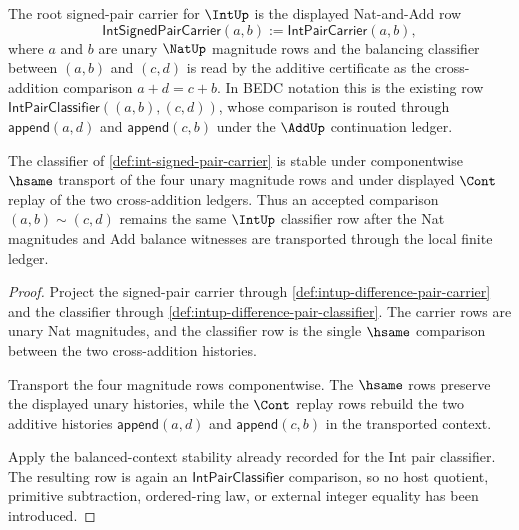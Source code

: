 \begin{definition}
\label{def:int-signed-pair-carrier}
The root signed-pair carrier for $\IntUp$ is the displayed Nat-and-Add row
$$
\mathsf{IntSignedPairCarrier}(a,b)
:=
\mathsf{IntPairCarrier}(a,b),
$$
where $a$ and $b$ are unary $\NatUp$ magnitude rows and the balancing classifier between $(a,b)$ and $(c,d)$ is read by the additive certificate as the cross-addition comparison $a+d=c+b$. In BEDC notation this is the existing row $\mathsf{IntPairClassifier}((a,b),(c,d))$, whose comparison is routed through $\mathsf{append}(a,d)$ and $\mathsf{append}(c,b)$ under the $\AddUp$ continuation ledger.
\end{definition}

\begin{theorem}
\label{thm:int-signed-pair-classifier-stability}
The classifier of \autoref{def:int-signed-pair-carrier} is stable under componentwise $\hsame$ transport of the four unary magnitude rows and under displayed $\Cont$ replay of the two cross-addition ledgers. Thus an accepted comparison $(a,b)\sim(c,d)$ remains the same $\IntUp$ classifier row after the Nat magnitudes and Add balance witnesses are transported through the local finite ledger.
\end{theorem}
\begin{proof}
Project the signed-pair carrier through \autoref{def:intup-difference-pair-carrier} and the classifier through \autoref{def:intup-difference-pair-classifier}. The carrier rows are unary Nat magnitudes, and the classifier row is the single $\hsame$ comparison between the two cross-addition histories.

Transport the four magnitude rows componentwise. The $\hsame$ rows preserve the displayed unary histories, while the $\Cont$ replay rows rebuild the two additive histories $\mathsf{append}(a,d)$ and $\mathsf{append}(c,b)$ in the transported context.

Apply the balanced-context stability already recorded for the Int pair classifier. The resulting row is again an $\mathsf{IntPairClassifier}$ comparison, so no host quotient, primitive subtraction, ordered-ring law, or external integer equality has been introduced.
\end{proof}

